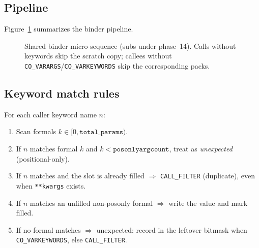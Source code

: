 \documentclass[11pt,a4paper]{article}
\begin{document}
\subsection{Pipeline}
Figure~\ref{fig:binder} summarizes the binder pipeline.

\begin{figure}[ht]
\centering
{}
\caption{Shared binder micro-sequence (subs under phase~14).
Calls without keywords skip the scratch copy; callees without
\texttt{CO\_VARARGS}/\texttt{CO\_VARKEYWORDS} skip the corresponding packs.}
\label{fig:binder}
\end{figure}

\subsection{Keyword match rules}
For each caller keyword name $n$:
\begin{enumerate}[leftmargin=*]
  \item Scan formals $k \in [0, \texttt{total\_params})$.
  \item If $n$ matches formal $k$ and $k < \texttt{posonlyargcount}$, treat as
    \emph{unexpected} (positional-only).
  \item If $n$ matches and the slot is already filled $\Rightarrow$
    \texttt{CALL\_FILTER} (duplicate), even when \texttt{**kwargs} exists.
  \item If $n$ matches an unfilled non-posonly formal $\Rightarrow$ write the
    value and mark filled.
  \item If no formal matches $\Rightarrow$ unexpected: record in the leftover
    bitmask when \texttt{CO\_VARKEYWORDS}, else \texttt{CALL\_FILTER}.
\end{enumerate}
\end{document}
